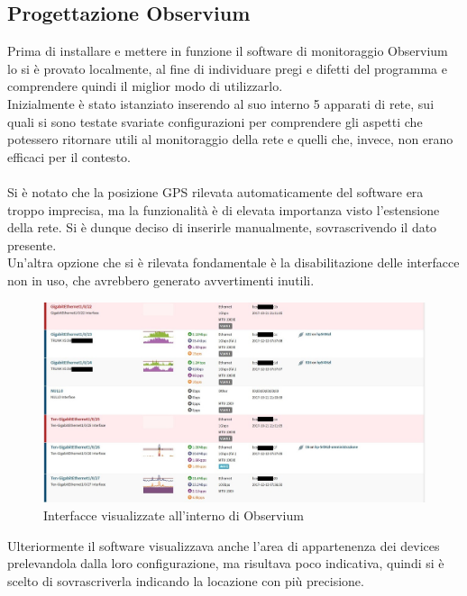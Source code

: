 \documentclass[Realizzazione.tex]{subfiles}
\begin{document}
\subsection{Progettazione Observium}
Prima di installare e mettere in funzione il software di monitoraggio Observium lo si è provato localmente, al fine di individuare pregi e difetti del programma e comprendere quindi il miglior modo di utilizzarlo.\\
Inizialmente è stato istanziato inserendo al suo interno 5 apparati di rete, sui quali si sono testate svariate configurazioni per comprendere gli aspetti che potessero ritornare utili al monitoraggio della rete e quelli che, invece, non erano efficaci per il contesto.\\\\
Si è notato che la posizione GPS rilevata automaticamente del software era troppo imprecisa, ma la funzionalità è di elevata importanza visto l'estensione della rete. Si è dunque deciso di inserirle manualmente, sovrascrivendo il dato presente. \\
Un'altra opzione che si è rilevata fondamentale è la disabilitazione delle interfacce non in uso, che avrebbero generato avvertimenti inutili. \\
\begin{figure}[H]
	\centering
	\includegraphics[width=1\linewidth]{"images/Observium_porte"}
	\caption{Interfacce visualizzate all'interno di Observium}
	\label{fig:Interfacce visualizzate all'interno di Observium}
\end{figure}
Ulteriormente il software visualizzava anche l'area di appartenenza dei devices prelevandola dalla loro configurazione, ma risultava poco indicativa, quindi si è scelto di sovrascriverla indicando la locazione con più precisione.
\end{document}
